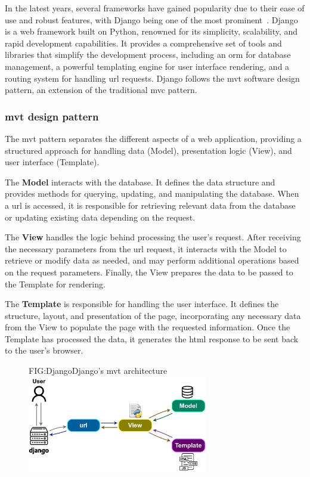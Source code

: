 In the latest years, several frameworks have gained popularity due to their ease of use and robust features, with Django being one of the most prominent~\cite{DJANGO-POP, DJANGO}. Django is a web framework built on Python, renowned for its simplicity, scalability, and rapid development capabilities. It provides a comprehensive set of tools and libraries that simplify the development process, including an \ac{orm} for database management, a powerful templating engine for user interface rendering, and a routing system for handling \acs{url} requests. Django follows the \ac{mvt} software design pattern, an extension of the traditional \ac{mvc} pattern.

\subsubsection{\acs{mvt} design pattern}

The \acl{mvt} pattern separates the different aspects of a web application, providing a structured approach for handling data (Model), presentation logic (View), and user interface (Template).

\begin{compactitem}[\textbullet]
    \item The \textbf{Model} interacts with the database. It defines the data structure and provides methods for querying, updating, and manipulating the database. When a \acs{url} is accessed, it is responsible for retrieving relevant data from the database or updating existing data depending on the request.
    \item The \textbf{View} handles the logic behind processing the user's request. After receiving the necessary parameters from the \acs{url} request, it interacts with the Model to retrieve or modify data as needed, and may perform additional operations based on the request parameters. Finally, the View prepares the data to be passed to the Template for rendering.
    \item The \textbf{Template} is responsible for handling the user interface. It defines the structure, layout, and presentation of the page, incorporating any necessary data from the View to populate the page with the requested information. Once the Template has processed the data, it generates the \acs{html} response to be sent back to the user's browser.
\end{compactitem}

\begin{figure}[Django's Model-View-Template architecture]{FIG:Django}{Django's \acl{mvt} architecture}\includegraphics[width=0.7\textwidth]{img/Django.pdf}
\end{figure}

